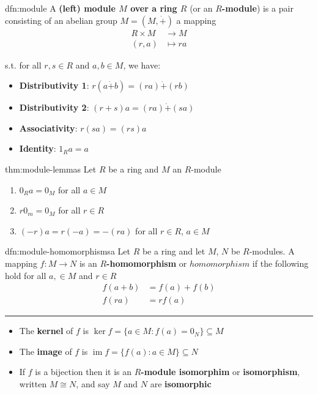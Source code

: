 \documentclass[landscape, 8pt]{extarticle}
\DeclareMathOperator{\im}{im}
\begin{document}
\begin{multicols}{3}
\begin{dfn}[Module]{dfn:module}{}
    A \textbf{(left) module $M$ over a ring $R$} (or an \textbf{$R$-module}) is a pair consisting of an abelian group $M = (M, \dot{+})$ a mapping
    \begin{align*}
        R \times M &\to M\\
        (r, a) &\mapsto ra
    \end{align*}

    s.t. for all $r, s\in R$ and $a,b\in M$, we have:
    \begin{itemize}
        \setlength\itemsep{0em}
        \item \textbf{Distributivity 1}: $r(a \dot{+} b) = (ra) \dot{+} (rb)$
        \item \textbf{Distributivity 2}: $(r + s)a = (ra) \dot{+} (sa)$
        \item \textbf{Associativity}: $r (sa) = (rs) a$
        \item \textbf{Identity}: $1_{R}a = a$
    \end{itemize}
\end{dfn}


\begin{thm}{thm:module-lemmas}{}
    Let $R$ be a ring and $M$ an $R$-module
    \begin{enumerate}
        \setlength\itemsep{0em}
        \item $0_{R}a = 0_{M}$ for all $a\in M$
        \item $r 0_{m} = 0_{M}$ for all $r\in R$
        \item $(-r) a = r(-a) = -(ra)$ for all $r\in R$, $a\in M$
    \end{enumerate}
\end{thm}

\newpage

\begin{dfn}{dfn:module-homomorphismsa}{}
    Let $R$ be a ring and let $M$, $N$ be $R$-modules. A mapping $f : M\to N$ is an \textbf{$R$-homomorphism} or \textbf{$homomorphism$} if the following hold for all $a,\in M$ and $r\in R$
    \begin{align*}
        f(a + b) &= f(a) + f(b)\\
        f(ra) &= rf(a)
    \end{align*}

    \noindent\rule{\textwidth}{0.2pt}
    \begin{itemize}[leftmargin=*]
        \setlength\itemsep{0em}
        \item The \textbf{kernel} of $f$ is $\ker f = \{a\in M : f(a) = 0_{N}\}\subseteq M$
        \item The \textbf{image} of $f$ is $\im f = \{f(a) : a\in M\}\subseteq N$
        \item If $f$ is a bijection then it is an \textbf{$R$-module isomorphim} or \textbf{isomorphism}, written $M \cong N$, and say $M$ and $N$ are \textbf{isomorphic}
    \end{itemize}


\end{dfn}
\end{multicols}
\end{document}
